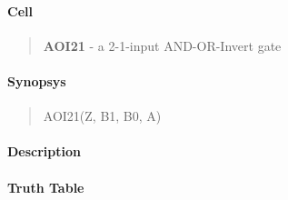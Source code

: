 \label{AOI21}
\paragraph{Cell}
\begin{quote}
    \textbf{AOI21} - a 2-1-input AND-OR-Invert gate
\end{quote}

\paragraph{Synopsys}
\begin{quote}
    AOI21(Z, B1, B0, A)
\end{quote}

\paragraph{Description}

%

\paragraph{Truth Table}


